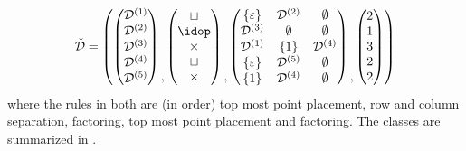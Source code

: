 \[
    \spec{D} = \left(
    \begin{pmatrix}
        \mathcal{D}^{(1)} \\\mathcal{D}^{(2)}\\\mathcal{D}^{(3)}\\\mathcal{D}^{(4)}\\\mathcal{D}^{(5)}    
    \end{pmatrix}
    \begin{matrix}\\ \\ \\ \\,\end{matrix}
    \begin{pmatrix}
        \sqcup\\
        \idop\\
        \times\\
        \sqcup\\
        \times
    \end{pmatrix}
    \begin{matrix}\\ \\ \\ \\,\end{matrix}
    \begin{pmatrix}
        \set{\varepsilon} & \mathcal{D}^{(2)} & \emptyset\\
        \mathcal{D}^{(3)} & \emptyset & \emptyset\\
        \mathcal{D}^{(1)} & \set{1} & \mathcal{D}^{(4)}\\
        \set{\varepsilon} & \mathcal{D}^{(5)} & \emptyset\\
        \set{1} & \mathcal{D}^{(4)} & \emptyset
    \end{pmatrix}
    \begin{matrix}\\ \\ \\ \\,\end{matrix}
    \begin{pmatrix}
        2\\1\\3\\2\\2
    \end{pmatrix}
    \right)
\]
where the rules in both are (in order) top most point placement, row and column separation, factoring, top most point placement and factoring. The classes are summarized in .

